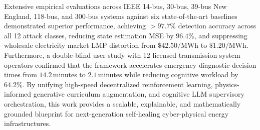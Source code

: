 \documentclass[journal,compsoc]{IEEEtran}
\begin{document}
Extensive empirical evaluations across IEEE 14-bus, 30-bus, 39-bus New England, 118-bus, and 300-bus systems against six state-of-the-art baselines demonstrated superior performance, achieving $>97.7\%$ detection accuracy across all 12 attack classes, reducing state estimation MSE by $96.4\%$, and suppressing wholesale electricity market LMP distortion from $\$42.50\text{/MWh}$ to $\$1.20\text{/MWh}$. Furthermore, a double-blind user study with 12 licensed transmission system operators confirmed that the framework accelerates emergency diagnostic decision times from $14.2$\,minutes to $2.1$\,minutes while reducing cognitive workload by $64.2\%$. By unifying high-speed decentralized reinforcement learning, physics-informed generative curriculum augmentation, and cognitive LLM supervisory orchestration, this work provides a scalable, explainable, and mathematically grounded blueprint for next-generation self-healing cyber-physical energy infrastructures.

\balance


\end{document}
